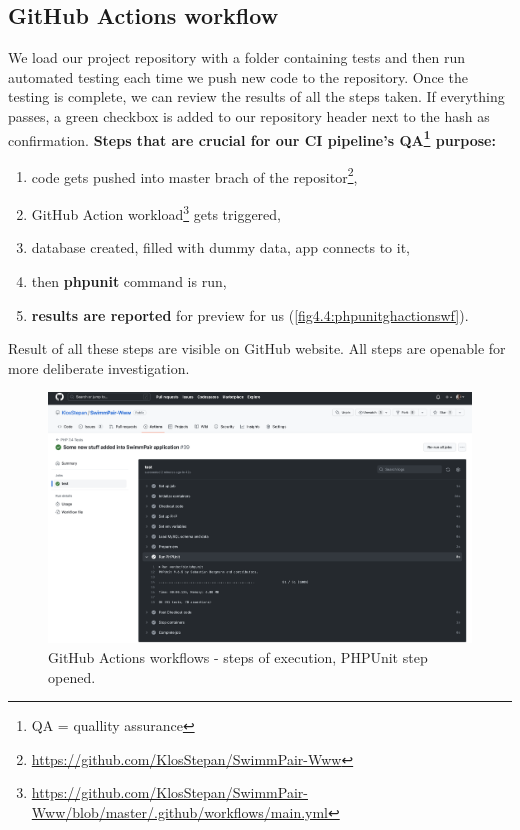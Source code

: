 \subsection{GitHub Actions workflow}
We load our project repository with a folder containing tests and then run automated testing each time we push new code to the repository. Once the testing is complete, we can review the results of all the steps taken. If everything passes, a green checkbox is added to our repository header next to the hash as confirmation. 
\newline
\textbf{Steps that are crucial for our CI pipeline's QA\footnote{QA = quallity assurance} purpose:}
\begin{enumerate}
    \item code gets pushed into master brach of the repositor\footnote{\url{https://github.com/KlosStepan/SwimmPair-Www}},
    \item GitHub Action workload\footnote{\url{https://github.com/KlosStepan/SwimmPair-Www/blob/master/.github/workflows/main.yml}} gets triggered,
    \item database created, filled with dummy data, app connects to it,
    \item then \textbf{phpunit} command is run,
    \item \textbf{results are reported} for preview for us (\autoref{fig4.4:phpunitghactionswf}).
\end{enumerate} 
Result of all these steps are visible on GitHub website. All steps are openable for more deliberate investigation.
\begin{figure}[h]	
    \centering	
    \includegraphics[scale=0.205]{img/phpunit_actionswf.png}
    \caption{GitHub Actions workflows - steps of execution, PHPUnit step opened.}
    \label{fig4.4:phpunitghactionswf}
\end{figure}
